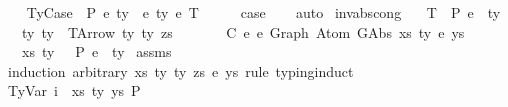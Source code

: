\begin{isabellebody}
\isamarkupfalse%
\isanewline
\ \ \isamarkupfalse%
\ {\isacharparenleft}{\kern0pt}TyCase\ {\isasymGamma}\ P\ e{}\ ty{}\ {\isasymGamma}{}\ e{}\ ty{}\ e{}\ T{\isacharparenright}{\kern0pt}\isanewline
\ \ \isamarkupfalse%
\ \isamarkupfalse%
\ {\isacharquery}{\kern0pt}case\isanewline
\ \ \isamarkupfalse%
\ auto\isanewline
{}\isamarkupfalse%
%
\endisatagproof
{\isafoldproof}%
%
\isadelimproof
\isanewline
%
\endisadelimproof
\isanewline
\isanewline
\isanewline
{}\isamarkupfalse%
\ inv{\isacharunderscore}{\kern0pt}abs{\isacharunderscore}{\kern0pt}cong{}{\isacharcolon}{\kern0pt}\isanewline
\ \ \ T{\isacharcolon}{\kern0pt}\ {\isachardoublequoteopen}{\isasymGamma}\ {\isasymturnstile}{\isacharbraceleft}{\kern0pt}P{\isacharbraceright}{\kern0pt}\ e{\isacharprime}{\kern0pt}\ {\isacharcolon}{\kern0pt}\ ty{\isachardoublequoteclose}\isanewline
\ \ \ ty{\isacharcolon}{\kern0pt}\ {\isachardoublequoteopen}ty\ {\isacharequal}{\kern0pt}\ TArrow\ ty{}\ ty{}\ zs{\isachardoublequoteclose}\isanewline
\ \ \ \ \ \ \ C{\isacharcolon}{\kern0pt}\ {\isachardoublequoteopen}e{\isacharprime}{\kern0pt}\ {\isasymsimeq}e\ Graph\ {\isacharparenleft}{\kern0pt}Atom\ {\isacharparenleft}{\kern0pt}GAbs\ xs\ ty{}{\isacharprime}{\kern0pt}\ e{\isacharparenright}{\kern0pt}\ ys{\isacharparenright}{\kern0pt}{\isachardoublequoteclose}\isanewline
\ \ \ {\isachardoublequoteopen}{\isacharparenleft}{\kern0pt}xs{\isacharcomma}{\kern0pt}\ ty{}{\isacharparenright}{\kern0pt}\ {\isacharhash}{\kern0pt}\ {\isasymGamma}\ {\isasymturnstile}{\isacharbraceleft}{\kern0pt}P{\isacharbraceright}{\kern0pt}\ e\ {\isacharcolon}{\kern0pt}\ ty{}{\isachardoublequoteclose}\isanewline
%
\isadelimproof
%
\endisadelimproof
%
\isatagproof
{}\isamarkupfalse%
\ assms\isanewline
{}\isamarkupfalse%
\ {\isacharparenleft}{\kern0pt}induction\ arbitrary{\isacharcolon}{\kern0pt}\ xs\ ty{}\ ty{}\ zs\ e\ ys\ rule{\isacharcolon}{\kern0pt}\ typing{\isachardot}{\kern0pt}induct{\isacharparenright}{\kern0pt}\isanewline
\ \ \isamarkupfalse%
\ {\isacharparenleft}{\kern0pt}TyVar\ i\ {\isasymGamma}\ xs\ ty\ ys\ P{\isacharparenright}{\kern0pt}\isanewline
\ \ \isamarkupfalse%
\ \isamarkupfalse%

\end{isabellebody}
